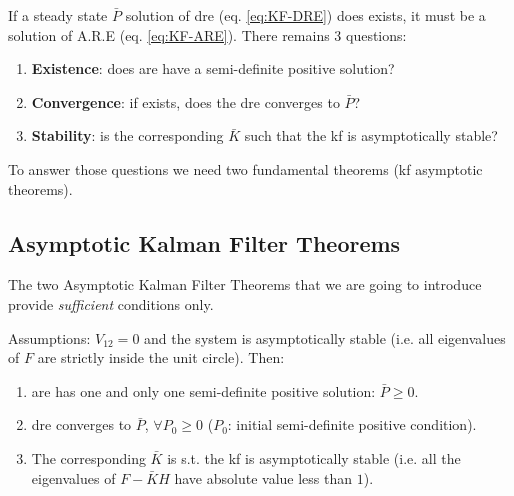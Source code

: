 If a steady state $\bar{P}$ solution of \gls{dre} (eq. \ref{eq:KF-DRE}) does exists, it must be a solution of A.R.E (eq. \ref{eq:KF-ARE}).
There remains 3 questions:
\begin{enumerate}
    \item \textbf{Existence}: does \gls{are} have a semi-definite positive solution?
    \item \textbf{Convergence}: if exists, does the \gls{dre} converges to $\bar{P}$?
    \item \textbf{Stability}: is the corresponding $\bar{K}$ such that the \gls{kf} is asymptotically stable?
\end{enumerate}


To answer those questions we need two fundamental theorems (\gls{kf} asymptotic theorems).

\subsection{Asymptotic Kalman Filter Theorems}
The two Asymptotic Kalman Filter Theorems that we are going to introduce provide \emph{sufficient} conditions only.

\begin{theorem}\label{th:1KF_as}
    Assumptions: $V_{12} = 0$ and the system is asymptotically stable (i.e. all eigenvalues of $F$ are strictly inside the unit circle).
    Then:
    \begin{enumerate}
        \item \gls{are} has one and only one semi-definite positive solution: $\bar{P} \ge 0$.
        \item \gls{dre} converges to $\bar{P}$, $\forall P_0 \ge 0$ ($P_0$: initial semi-definite positive condition).
        \item The corresponding $\bar{K}$ is s.t. the \gls{kf} is asymptotically stable (i.e. all the eigenvalues of $F-\bar{K}H$ have absolute value less than $1$).
    \end{enumerate}
\end{theorem}

